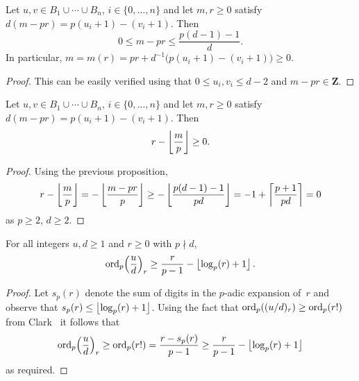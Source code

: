 \begin{prop} \label{prop:mpr1}
Let $u, v \in B_1 \cup \dotsb \cup B_n$, $i \in \{0,\dotsc,n\}$ and 
let $m, r \geq 0$ satisfy $d(m-pr) = p(u_i + 1) - (v_i + 1)$.  Then 
\begin{equation*}
0 \leq m - p r \leq \frac{p(d-1)-1}{d}.
\end{equation*}
In particular, $m = m(r) = pr + d^{-1}\bigl(p(u_i+1)-(v_i+1)\bigr) \geq 0$.
\end{prop}

\begin{proof}
This can be easily verified using that $0 \leq u_i, v_i \leq d - 2$ 
and $m - pr \in \mathbf{Z}$.
\end{proof}

\begin{prop} \label{prop:mpr2}
Let $u, v \in B_1 \cup \dotsb \cup B_n$, $i \in \{0,\dotsc,n\}$ and 
let $m, r \geq 0$ satisfy $d(m-pr) = p(u_i + 1) - (v_i + 1)$.  Then 
\begin{equation*}
r - \left\lfloor\frac{m}{p}\right\rfloor \geq 0.
\end{equation*}
\end{prop}

\begin{proof}
Using the previous proposition,
\begin{equation*}
r - \left\lfloor\frac{m}{p}\right\rfloor 
= - \left\lfloor\frac{m-pr}{p}\right\rfloor 
\geq - \left\lfloor\frac{p(d-1)-1}{pd}\right\rfloor 
= -1 + \left\lceil\frac{p + 1}{pd}\right\rceil 
= 0 
\end{equation*}
as $p \geq 2$, $d \geq 2$.
\end{proof}

\begin{prop} \label{prop:rfac}
For all integers $u, d \geq 1$ and $r \geq 0$ with $p \nmid d$, 
\begin{equation*}
\operatorname{ord}_p\Bigl(\frac{u}{d}\Bigr)_r \geq \frac{r}{p-1} - \left\lfloor\log_p(r) + 1\right\rfloor.
\end{equation*}
\end{prop}

\begin{proof}
Let $s_p(r)$ denote the sum of digits in the $p$-adic expansion of~$r$ 
and observe that $s_p(r) \leq \left\lfloor\log_p(r) + 1\right\rfloor$.  Using the fact that 
$\operatorname{ord}_p((u/d)_r) \geq \operatorname{ord}_p(r!)$ from Clark~\citep[Page~265, Case~3]{Clark66} 
it follows that 
\begin{equation*}
\operatorname{ord}_p\Bigl(\frac{u}{d}\Bigr)_r \geq \operatorname{ord}_p(r!) = \frac{r - s_p(r)}{p-1} \geq \frac{r}{p-1} - \left\lfloor\log_p(r) + 1\right\rfloor
\end{equation*}
as required.
\end{proof}

